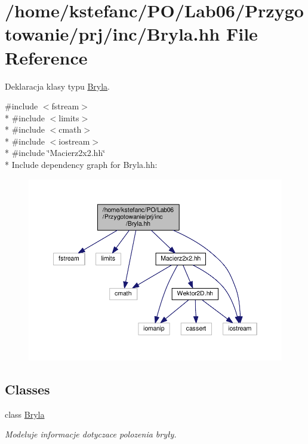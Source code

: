 \hypertarget{_bryla_8hh}{\section{/home/kstefanc/\+P\+O/\+Lab06/\+Przygotowanie/prj/inc/\+Bryla.hh File Reference}
\label{_bryla_8hh}
}


Deklaracja klasy typu \hyperlink{class_bryla}{Bryla}.  


{\ttfamily \#include $<$fstream$>$}\\*
{\ttfamily \#include $<$limits$>$}\\*
{\ttfamily \#include $<$cmath$>$}\\*
{\ttfamily \#include $<$iostream$>$}\\*
{\ttfamily \#include \char`\"{}Macierz2x2.\+hh\char`\"{}}\\*
Include dependency graph for Bryla.\+hh\+:\nopagebreak
\begin{figure}[H]
\begin{center}
\leavevmode
\includegraphics[width=350pt]{_bryla_8hh__incl}
\end{center}
\end{figure}
\subsection*{Classes}
\begin{DoxyCompactItemize}
\item 
class \hyperlink{class_bryla}{Bryla}
\begin{DoxyCompactList}\small\item\em Modeluje informacje dotyczace polozenia bryły. \end{DoxyCompactList}\end{DoxyCompactItemize}
